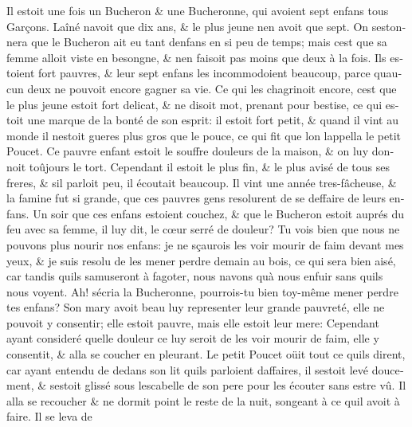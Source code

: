 \documentclass[14pt,a4paper]{memoir}
\begin{document}
{{\begin{otherlanguage}{french}
Il estoit une fois un Bucheron \& une Bucheronne, qui avoient sept
enfans tous Garçons. L\textquotesingle aîné n\textquotesingle avoit que
dix ans, \& le plus jeune n\textquotesingle en avoit que sept. On
s\textquotesingle estonnera que le Bucheron ait eu tant
d\textquotesingle enfans en si peu de temps; mais c\textquotesingle est
que sa femme alloit viste en besongne, \& n\textquotesingle en faisoit
pas moins que deux à la fois. Ils estoient fort pauvres, \& leur sept
enfans les incommodoient beaucoup, parce qu\textquotesingle aucun
d\textquotesingle eux ne pouvoit encore gagner sa vie. Ce qui les
chagrinoit encore, c\textquotesingle est que le plus jeune estoit fort
delicat, \& ne disoit mot, prenant pour bestise, ce qui estoit une
marque de la bonté de son esprit: il estoit fort petit, \& quand il vint
au monde il n\textquotesingle estoit gueres plus gros que le pouce, ce
qui fit que l\textquotesingle on l\textquotesingle appella le petit
Poucet. Ce pauvre enfant estoit le souffre douleurs de la maison, \& on
luy donnoit toûjours le tort. Cependant il estoit le plus fin, \& le
plus avisé de tous ses freres, \& s\textquotesingle il parloit peu, il
écoutait beaucoup. Il vint une année tres-fâcheuse, \& la famine fut si
grande, que ces pauvres gens resolurent de se deffaire de leurs enfans.
Un soir que ces enfans estoient couchez, \& que le Bucheron estoit
auprés du feu avec sa femme, il luy dit, le cœur serré de douleur? Tu
vois bien que nous ne pouvons plus nourir nos enfans: je ne sçaurois les
voir mourir de faim devant mes yeux, \& je suis resolu de les mener
perdre demain au bois, ce qui sera bien aisé, car tandis
qu\textquotesingle ils s\textquotesingle amuseront à fagoter, nous
n\textquotesingle avons qu\textquotesingle à nous enfuir sans
qu\textquotesingle ils nous voyent. Ah! s\textquotesingle écria la
Bucheronne, pourrois-tu bien toy-même mener perdre tes enfans? Son mary
avoit beau luy representer leur grande pauvreté, elle ne pouvoit y
consentir; elle estoit pauvre, mais elle estoit leur mere: Cependant
ayant consideré quelle douleur ce luy seroit de les voir mourir de faim,
elle y consentit, \& alla se coucher en pleurant. Le petit Poucet oüit
tout ce qu\textquotesingle ils dirent, car ayant entendu de dedans son
lit qu\textquotesingle ils parloient d\textquotesingle affaires, il
s\textquotesingle estoit levé doucement, \& s\textquotesingle estoit
glissé sous l\textquotesingle escabelle de son pere pour les écouter
sans estre vû. Il alla se recoucher \& ne dormit point le reste de la
nuit, songeant à ce qu\textquotesingle il avoit à faire. Il se leva de

\end{otherlanguage}}}
\end{document}

